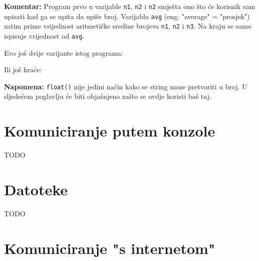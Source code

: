 	\textbf{Komentar:} Program prvo u varijable \verb+n1+, \verb+n2+ i \verb+n2+
	smješta ono što će korisnik sam upisati kad ga se upita da upiše broj.
	Varijabla \verb"avg" (eng. "average" = "prosjek") zatim prime vrijednost
	aritmetičke sredine brojeva 
	\verb"n1",
	\verb"n2" i 
	\verb"n3".
	Na kraju se samo ispisuje vrijednost od \verb"avg".

	Evo još dvije varijante istog programa:


	Ili još kraće:


	\textbf{Napomena:} \verb+float()+ nije jedini način kako se string moze
	pretvoriti u broj. U sljedećem poglavlju će biti objašnjeno zašto se
	ovdje koristi baš taj.

\section{Komuniciranje putem konzole}

TODO

\section{Datoteke}

TODO

\section{Komuniciranje "s internetom"}
